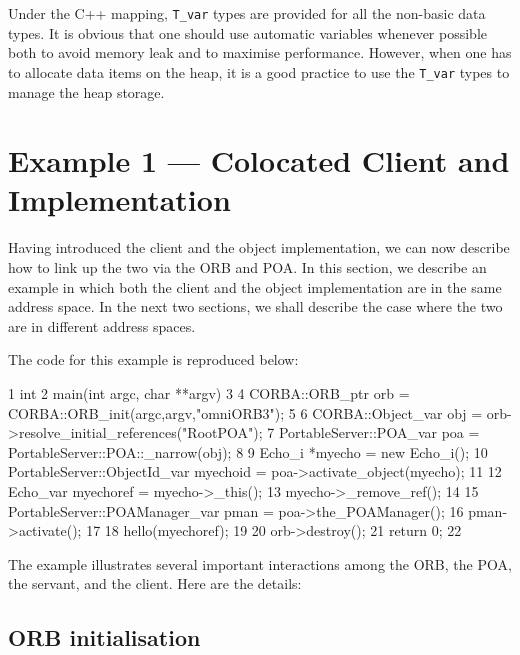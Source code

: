 \documentclass[11pt,twoside,a4paper]{book}
\newcommand{\type}[1]{\texttt{#1}}
\begin{document}
Under the C++ mapping, \type{T\_var} types are provided for all the
non-basic data types.  It is obvious that one should use automatic
variables whenever possible both to avoid memory leak and to maximise
performance. However, when one has to allocate data items on the heap,
it is a good practice to use the \type{T\_var} types to manage the
heap storage.

\section{Example 1 --- Colocated Client and Implementation}
\label{objeg1}

Having introduced the client and the object implementation, we can now
describe how to link up the two via the ORB and POA. In this section,
we describe an example in which both the client and the object
implementation are in the same address space. In the next two
sections, we shall describe the case where the two are in different
address spaces.

The code for this example is reproduced below:


\lstset{labelstep=1,gobble=4}
\begin{cxxlisting}
 1  int
 2  main(int argc, char **argv)
 3  {
 4    CORBA::ORB_ptr orb = CORBA::ORB_init(argc,argv,"omniORB3");
 5
 6    CORBA::Object_var       obj = orb->resolve_initial_references("RootPOA");
 7    PortableServer::POA_var poa = PortableServer::POA::_narrow(obj);
 8
 9    Echo_i *myecho = new Echo_i();
10    PortableServer::ObjectId_var myechoid = poa->activate_object(myecho);
11
12    Echo_var myechoref = myecho->_this();
13    myecho->_remove_ref();
14
15    PortableServer::POAManager_var pman = poa->the_POAManager();
16    pman->activate();
17
18    hello(myechoref);
19
20    orb->destroy();
21    return 0;
22  }
\end{cxxlisting}
\lstset{labelstep=0,gobble=0}

The example illustrates several important interactions among the ORB,
the POA, the servant, and the client. Here are the details:

\subsection{ORB initialisation}
\end{document}
